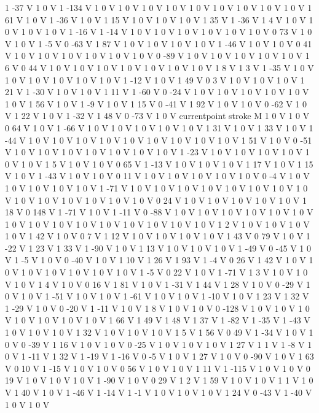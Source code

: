 {{1 -37 V
1 0 V
1 -134 V
1 0 V
1 0 V
1 0 V
1 0 V
1 0 V
1 0 V
1 0 V
1 0 V
1 0 V
1 61 V
1 0 V
1 -36 V
1 0 V
1 15 V
1 0 V
1 0 V
1 0 V
1 35 V
1 -36 V
1 4 V
1 0 V
1 0 V
1 0 V
1 0 V
1 -16 V
1 -14 V
1 0 V
1 0 V
1 0 V
1 0 V
1 0 V
1 0 V
0 73 V
1 0 V
1 0 V
1 -5 V
0 -63 V
1 87 V
1 0 V
1 0 V
1 0 V
1 0 V
1 -46 V
1 0 V
1 0 V
0 41 V
1 0 V
1 0 V
1 0 V
1 0 V
1 0 V
1 0 V
0 -89 V
1 0 V
1 0 V
1 0 V
1 0 V
1 0 V
1 6 V
0 44 V
1 0 V
1 0 V
1 0 V
1 0 V
1 0 V
1 0 V
1 0 V
1 8 V
1 3 V
1 -35 V
1 0 V
1 0 V
1 0 V
1 0 V
1 0 V
1 0 V
1 -12 V
1 0 V
1 49 V
0 3 V
1 0 V
1 0 V
1 0 V
1 21 V
1 -30 V
1 0 V
1 0 V
1 11 V
1 -60 V
0 -24 V
1 0 V
1 0 V
1 0 V
1 0 V
1 0 V
1 0 V
1 56 V
1 0 V
1 -9 V
1 0 V
1 15 V
0 -41 V
1 92 V
1 0 V
1 0 V
0 -62 V
1 0 V
1 22 V
1 0 V
1 -32 V
1 48 V
0 -73 V
1 0 V
currentpoint stroke M
1 0 V
1 0 V
0 64 V
1 0 V
1 -66 V
1 0 V
1 0 V
1 0 V
1 0 V
1 0 V
1 31 V
1 0 V
1 33 V
1 0 V
1 -44 V
1 0 V
1 0 V
1 0 V
1 0 V
1 0 V
1 0 V
1 0 V
1 0 V
1 0 V
1 51 V
1 0 V
0 -51 V
1 0 V
1 0 V
1 0 V
1 0 V
1 0 V
1 0 V
1 0 V
1 -23 V
1 0 V
1 0 V
1 0 V
1 0 V
1 0 V
1 0 V
1 5 V
1 0 V
1 0 V
0 65 V
1 -13 V
1 0 V
1 0 V
1 0 V
1 17 V
1 0 V
1 15 V
1 0 V
1 -43 V
1 0 V
1 0 V
0 11 V
1 0 V
1 0 V
1 0 V
1 0 V
1 0 V
0 -4 V
1 0 V
1 0 V
1 0 V
1 0 V
1 0 V
1 -71 V
1 0 V
1 0 V
1 0 V
1 0 V
1 0 V
1 0 V
1 0 V
1 0 V
1 0 V
1 0 V
1 0 V
1 0 V
1 0 V
1 0 V
0 24 V
1 0 V
1 0 V
1 0 V
1 0 V
1 0 V
1 18 V
0 148 V
1 -71 V
1 0 V
1 -11 V
0 -88 V
1 0 V
1 0 V
1 0 V
1 0 V
1 0 V
1 0 V
1 0 V
1 0 V
1 0 V
1 0 V
1 0 V
1 0 V
1 0 V
1 0 V
1 0 V
1 2 V
1 0 V
1 0 V
1 0 V
1 0 V
1 42 V
1 0 V
0 7 V
1 12 V
1 0 V
1 0 V
1 0 V
1 0 V
1 43 V
0 79 V
1 0 V
1 -22 V
1 23 V
1 33 V
1 -90 V
1 0 V
1 13 V
1 0 V
1 0 V
1 0 V
1 -49 V
0 -45 V
1 0 V
1 -5 V
1 0 V
0 -40 V
1 0 V
1 10 V
1 26 V
1 93 V
1 -4 V
0 26 V
1 42 V
1 0 V
1 0 V
1 0 V
1 0 V
1 0 V
1 0 V
1 0 V
1 -5 V
0 22 V
1 0 V
1 -71 V
1 3 V
1 0 V
1 0 V
1 0 V
1 4 V
1 0 V
0 16 V
1 81 V
1 0 V
1 -31 V
1 44 V
1 28 V
1 0 V
0 -29 V
1 0 V
1 0 V
1 -51 V
1 0 V
1 0 V
1 -61 V
1 0 V
1 0 V
1 -10 V
1 0 V
1 23 V
1 32 V
1 -29 V
1 0 V
0 -20 V
1 -11 V
1 0 V
1 8 V
1 0 V
1 0 V
0 -128 V
1 0 V
1 0 V
1 0 V
1 0 V
1 0 V
1 0 V
1 0 V
1 66 V
1 49 V
1 48 V
1 37 V
1 -82 V
1 -35 V
1 -43 V
1 0 V
1 0 V
1 0 V
1 32 V
1 0 V
1 0 V
1 0 V
1 5 V
1 56 V
0 49 V
1 -34 V
1 0 V
1 0 V
0 -39 V
1 16 V
1 0 V
1 0 V
0 -25 V
1 0 V
1 0 V
1 0 V
1 27 V
1 1 V
1 -8 V
1 0 V
1 -11 V
1 32 V
1 -19 V
1 -16 V
0 -5 V
1 0 V
1 27 V
1 0 V
0 -90 V
1 0 V
1 63 V
0 10 V
1 -15 V
1 0 V
1 0 V
0 56 V
1 0 V
1 0 V
1 11 V
1 -115 V
1 0 V
1 0 V
0 19 V
1 0 V
1 0 V
1 0 V
1 -90 V
1 0 V
0 29 V
1 2 V
1 59 V
1 0 V
1 0 V
1 1 V
1 0 V
1 40 V
1 0 V
1 -46 V
1 -14 V
1 -1 V
1 0 V
1 0 V
1 0 V
1 24 V
0 -43 V
1 -40 V
1 0 V
1 0 V
}}
